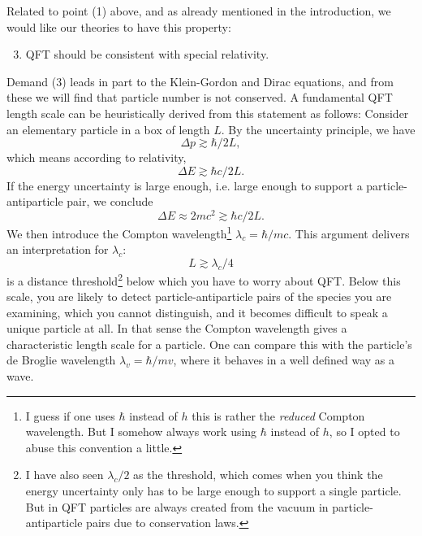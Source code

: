 Related to point (1) above, and as already mentioned in the introduction, we
would like our theories to have this property:
\begin{enumerate}
  \setcounter{enumi}{2}
  \item QFT should be consistent with special relativity.
\end{enumerate}
Demand (3) leads in part to the Klein-Gordon and Dirac equations, and from these
we will find that particle number is not conserved.
A fundamental QFT length scale can be heuristically derived from this statement 
as follows: Consider an elementary particle in a box of length $L$. By the 
uncertainty principle, we have
\begin{equation}
  \Delta p\gtrsim \hbar/2L,
\end{equation}
which means according to relativity,
\begin{equation}
  \Delta E\gtrsim \hbar c/2L.
\end{equation}
If the energy uncertainty is large enough, i.e. large enough to support a
particle-antiparticle pair, we conclude
\begin{equation}
  \Delta E\approx 2mc^2 \gtrsim\hbar c/2L.
\end{equation}
We then introduce the Compton wavelength\footnote{I guess if
one uses $\hbar$ instead of $h$ this is rather the {\it reduced} Compton
wavelength. But I somehow always work using $\hbar$ instead of $h$, so I opted
to abuse this convention a little.}
$\lambda_c=\hbar/mc$. This argument delivers an interpretation for 
$\lambda_c$:
\begin{equation}
  L \gtrsim \lambda_c/4
\end{equation}
is a distance threshold\footnote{I have also seen $\lambda_c/2$ as the threshold,
which comes when you think the energy uncertainty only has to be large enough to
support a single particle. But in QFT particles are always created from the
vacuum in particle-antiparticle pairs due to conservation laws.} below which 
you have to worry about QFT. Below this scale, you are likely to detect
particle-antiparticle pairs of the species you are examining, which you cannot
distinguish, and it becomes difficult to speak a unique particle at all. In that
sense the Compton wavelength gives a characteristic length scale for a
particle. One can compare this with the particle's de Broglie wavelength
$\lambda_v=\hbar/mv$, where it behaves in a well defined way as a wave.



